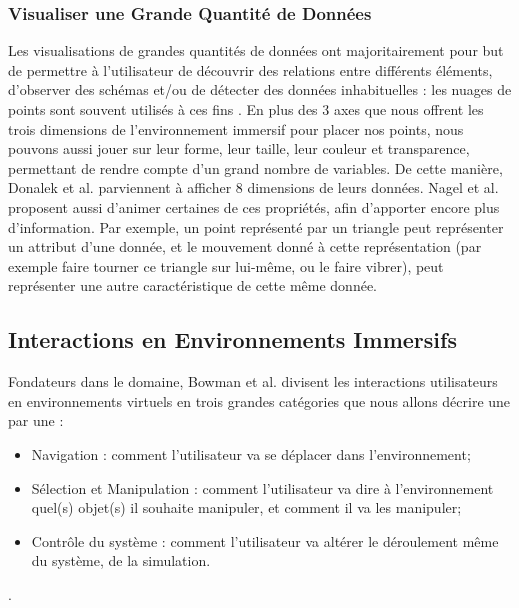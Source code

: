 	\subsubsection{Visualiser une Grande Quantité de Données}
	
	 Les visualisations de grandes quantités de données ont majoritairement pour but de permettre à l'utilisateur de découvrir des relations entre différents éléments, d'observer des schémas et/ou de détecter des données inhabituelles : les nuages de points sont souvent utilisés à ces fins \cite{nagel_methods_2001}.
	En plus des 3 axes que nous offrent les trois dimensions de l'environnement immersif pour placer nos points, nous pouvons aussi jouer sur leur forme, leur taille, leur couleur et transparence, permettant de rendre compte d'un grand nombre de variables. De cette manière, Donalek et al. \cite{donalek_immersive_2014} parviennent à afficher 8 dimensions de leurs données. Nagel et al. \cite{nagel_methods_2001} proposent aussi d'animer certaines de ces propriétés, afin d'apporter encore plus d'information. Par exemple, un point représenté par un triangle peut représenter un attribut d'une donnée, et le mouvement donné à cette représentation (par exemple faire tourner ce triangle sur lui-même, ou le faire vibrer), peut représenter une autre caractéristique de cette même donnée.
	
	\subsection{Interactions en Environnements Immersifs}
	
	Fondateurs dans le domaine, Bowman et al. \cite{bowman_introduction_2001} divisent les interactions utilisateurs en environnements virtuels en trois grandes catégories que nous allons décrire une par une :
	\begin{itemize}
		\item Navigation : comment l'utilisateur va se déplacer dans l'environnement;
		\item Sélection et Manipulation : comment l'utilisateur va dire à l'environnement quel(s) objet(s) il souhaite manipuler, et comment il va les manipuler;
		\item Contrôle du système : comment l'utilisateur va altérer le déroulement même du système, de la simulation.
	\end{itemize}.
	
